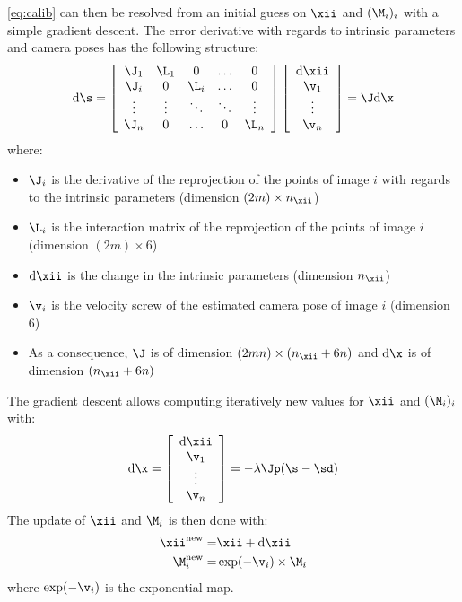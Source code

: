 \documentclass{ecnreport}
\begin{document}
\eqref{eq:calib} can then be resolved from an initial guess on $\xii$ and $(\M_i)_i$ with a simple gradient descent. 
The error derivative with regards to intrinsic parameters and camera poses has the following structure:
\newcommand{\der}{\text{d}}
\begin{equation}\label{eq:jacob}
 \der\s =  \left[\begin{array}{ccccc}
           \J_1 & \L_1 &  0 &  \hdots & 0 \\ 
           \J_i & 0 & \L_i &  \hdots & 0 \\
           \vdots& \vdots & \ddots & \ddots & \vdots\\
           \J_n & 0 & \hdots & 0 & \L_n
            \end{array}\right]
            \left[\begin{array}{c}\der\xii \\ \v_1 \\ \vdots \\ \v_n\end{array}\right]
             = \J\der\x
\end{equation}
where:
\begin{itemize}
\item $\J_i$ is the derivative of the reprojection of the points of image $i$ with regards to the intrinsic parameters (dimension $(2m)\times n_\xii$)
 \item $\L_i$ is the interaction matrix of the reprojection of the points of image $i$ (dimension $(2m)\times 6$)
 \item $\der\xii$ is the change in the intrinsic parameters (dimension $n_\xii$) 
 \item $\v_i$ is the velocity screw of the estimated camera pose of image $i$ (dimension $6$)
 \item As a consequence, $\J$ is of dimension $(2mn)\times (n_\xii+6n)$ and $\der\x$ is of dimension  $(n_\xii+6n)$
\end{itemize}
The gradient descent allows computing iteratively new values for $\xii$ and $(\M_i)_i$ with:
\begin{equation}
 \der\x = \left[\begin{array}{c}\der\xii \\ \v_1 \\ \vdots \\ \v_n\end{array}\right] = -\lambda\Jp(\s - \sd)
\end{equation}
The update of $\xii$ and $\M_i$ is then done with:
\begin{eqnarray}
 \xii^{\text{new}} =& \xii + \der\xii \label{upd:xi}\\
 \M_i^{\text{new}} =& \exp(-\v_i)\times\M_i \label{upd:M}
\end{eqnarray}
where $\exp(-\v_i)$ is the exponential map.\\
\end{document}
